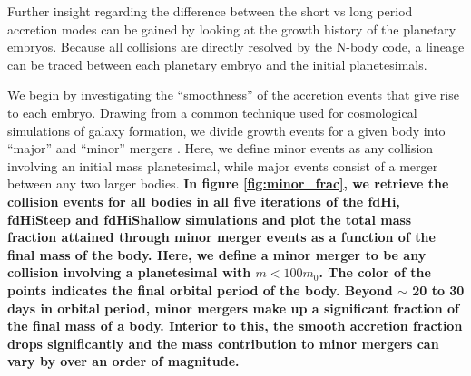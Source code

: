 \documentclass[twocolumn,linenumbers]{aastex63}
\begin{document}
Further insight regarding the difference between the short vs long period accretion modes can be gained by looking at the 
growth history of the planetary embryos. Because all collisions are directly resolved by the N-body code, a lineage can be 
traced between each planetary embryo and the initial planetesimals.

We begin by investigating the ``smoothness'' of the accretion events
that give rise to each embryo. Drawing from a common technique used
for cosmological simulations of galaxy formation, we divide growth events for
a given body into ``major'' and ``minor'' mergers \citep{kauffmann93, murali02, lhullier12}. 
Here, we define minor events as any collision involving an initial mass 
planetesimal, while major events consist of a merger between any two larger bodies.
\textbf{In figure \ref{fig:minor_frac}, we retrieve the collision events for all bodies in all five iterations of the fdHi, fdHiSteep and fdHiShallow
simulations and plot the total mass fraction attained through minor merger events as a function of the final mass of the body. Here, we define a minor merger
to be any collision involving a planetesimal with $m < 100 m_{0}$. The color of the
points indicates the final orbital period of the body. Beyond $\sim$ 20 to 30 days in orbital period, minor mergers make up a significant fraction of the final mass of a body. Interior to this, the smooth accretion fraction drops significantly and the mass contribution to minor mergers can vary by over an order of magnitude.}
\end{document}
